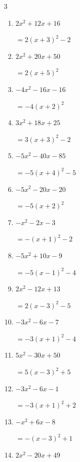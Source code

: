 \begin{multicols}{3}
\begin{enumerate}
        $=-4\left( x+4\right)^{2}-2$

  \item $2x^{2}+12x+16$

        $=2\left( x+3\right)^{2}-2$

  \item $2x^{2}+20x+50$

        $=2\left( x+5\right)^{2}$

  \item $-4x^{2}-16x-16$

        $=-4\left( x+2\right)^{2}$

  \item $3x^{2}+18x+25$

        $=3\left( x+3\right)^{2}-2$

  \item $-5x^{2}-40x-85$

        $=-5\left( x+4\right)^{2}-5$

  \item $-5x^{2}-20x-20$

        $=-5\left( x+2\right)^{2}$

\columnbreak %

  \item $-x^{2}-2x-3$

        $=-\left( x+1\right)^{2}-2$

  \item $-5x^{2}+10x-9$

        $=-5\left( x-1\right)^{2}-4$

  \item $2x^{2}-12x+13$

        $=2\left( x-3\right)^{2}-5$

  \item $-3x^{2}-6x-7$

        $=-3\left( x+1\right)^{2}-4$

  \item $5x^{2}-30x+50$

        $=5\left( x-3\right)^{2}+5$

  \item $-3x^{2}-6x-1$

        $=-3\left( x+1\right)^{2}+2$

  \item $-x^{2}+6x-8$

        $=-\left( x-3\right)^{2}+1$

  \item $2x^{2}-20x+49$


\end{enumerate}
\end{multicols}
